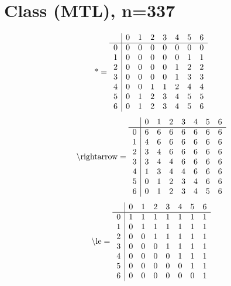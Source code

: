 \documentclass[11pt]{article}
\begin{document}
\section{Class (MTL), n=337}
\[\text{*} = 
\begin{array}{r | r r r r r r r}
 & 0 & 1 & 2 & 3 & 4 & 5 & 6 \\ \hline
0 & 0 & 0 & 0 & 0 & 0 & 0 & 0 \\
1 & 0 & 0 & 0 & 0 & 0 & 1 & 1 \\
2 & 0 & 0 & 0 & 0 & 1 & 2 & 2 \\
3 & 0 & 0 & 0 & 0 & 1 & 3 & 3 \\
4 & 0 & 0 & 1 & 1 & 2 & 4 & 4 \\
5 & 0 & 1 & 2 & 3 & 4 & 5 & 5 \\
6 & 0 & 1 & 2 & 3 & 4 & 5 & 6 \\
\end{array}
\]
\[\text{\textbackslash rightarrow} = 
\begin{array}{r | r r r r r r r}
 & 0 & 1 & 2 & 3 & 4 & 5 & 6 \\ \hline
0 & 6 & 6 & 6 & 6 & 6 & 6 & 6 \\
1 & 4 & 6 & 6 & 6 & 6 & 6 & 6 \\
2 & 3 & 4 & 6 & 6 & 6 & 6 & 6 \\
3 & 3 & 4 & 4 & 6 & 6 & 6 & 6 \\
4 & 1 & 3 & 4 & 4 & 6 & 6 & 6 \\
5 & 0 & 1 & 2 & 3 & 4 & 6 & 6 \\
6 & 0 & 1 & 2 & 3 & 4 & 5 & 6 \\
\end{array}
\]
\[\text{\textbackslash le} = 
\begin{array}{r | r r r r r r r}
 & 0 & 1 & 2 & 3 & 4 & 5 & 6 \\ \hline
0 & 1 & 1 & 1 & 1 & 1 & 1 & 1 \\
1 & 0 & 1 & 1 & 1 & 1 & 1 & 1 \\
2 & 0 & 0 & 1 & 1 & 1 & 1 & 1 \\
3 & 0 & 0 & 0 & 1 & 1 & 1 & 1 \\
4 & 0 & 0 & 0 & 0 & 1 & 1 & 1 \\
5 & 0 & 0 & 0 & 0 & 0 & 1 & 1 \\
6 & 0 & 0 & 0 & 0 & 0 & 0 & 1 \\
\end{array}
\]
\end{document}
